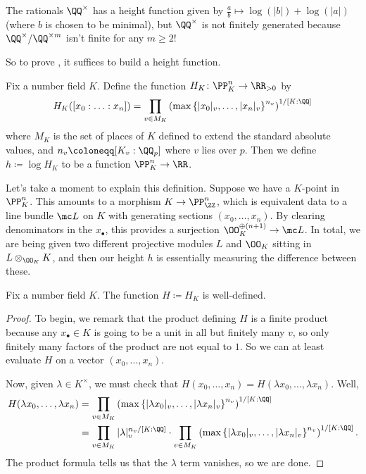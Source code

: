 \documentclass[../notes.tex]{subfiles}
\begin{document}
\begin{remark}
	The rationals $\QQ^\times$ has a height function given by $\frac ab\mapsto\log(|b|)+\log(|a|)$ (where $b$ is chosen to be minimal), but $\QQ^\times$ is not finitely generated because $\QQ^\times/\QQ^{\times m}$ isn't finite for any $m\ge2$!
\end{remark}
So to prove , it suffices to build a height function.
\begin{definition}
	Fix a number field $K$. Define the function $H_K\colon\PP^n_K\to\RR_{>0}$ by
	\[H_K([x_0:\ldots:x_n])=\prod_{v\in M_K}\left(\max\left\{|x_0|_v,\ldots,|x_n|_v\right\}^{n_v}\right)^{1/[K:\QQ]}\]
	where $M_K$ is the set of places of $K$ defined to extend the standard absolute values, and $n_v\coloneqq[K_v:\QQ_p]$ where $v$ lies over $p$. Then we define $h\coloneqq\log H_K$ to be a function $\PP^n_K\to\RR$.
\end{definition}
\begin{remark}
	Let's take a moment to explain this definition. Suppose we have a $K$-point in $\PP^n_K$. This amounts to a morphism $K\to\PP^n_\ZZ$, which is equivalent data to a line bundle $\mc L$ on $K$ with generating sections $(x_0,\ldots,x_n)$. By clearing denominators in the $x_\bullet$, this provides a surjection $\OO_K^{\oplus(n+1)}\to\mc L$. In total, we are being given two different projective modules $L$ and $\OO_K$ sitting in $L\otimes_{\OO_K}K$, and then our height $h$ is essentially measuring the difference between these.
\end{remark}
\begin{lemma}
	Fix a number field $K$. The function $H\coloneqq H_K$ is well-defined.
\end{lemma}
\begin{proof}
	To begin, we remark that the product defining $H$ is a finite product because any $x_\bullet\in K$ is going to be a unit in all but finitely many $v$, so only finitely many factors of the product are not equal to $1$. So we can at least evaluate $H$ on a vector $(x_0,\ldots,x_n)$.
	
	Now, given $\lambda\in K^\times$, we must check that $H(x_0,\ldots,x_n)=H(\lambda x_0,\ldots,\lambda x_n)$. Well,
	\begin{align*}
		H(\lambda x_0,\ldots,\lambda x_n) &= \prod_{v\in M_K}\left(\max\left\{|\lambda x_0|_v,\ldots,|\lambda x_n|_v\right\}^{n_v}\right)^{1/[K:\QQ]} \\
		&= \prod_{v\in M_K}|\lambda|_v^{n_v/[K:\QQ]}\cdot\prod_{v\in M_K}\left(\max\left\{|\lambda x_0|_v,\ldots,|\lambda x_n|_v\right\}^{n_v}\right)^{1/[K:\QQ]}.
	\end{align*}
	The product formula tells us that the $\lambda$ term vanishes, so we are done.
\end{proof}
\end{document}
